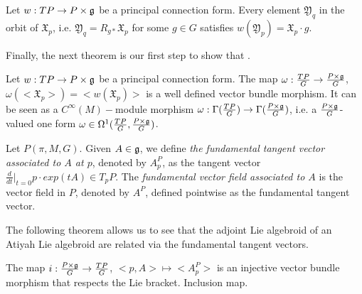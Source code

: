 \begin{proposition}
Let $w:TP \to P \times \mathfrak{g}$ be a principal connection form. Every element $\mathfrak{Y}_q$ in the orbit of $\mathfrak{X}_p$, i.e. $\mathfrak{Y}_q = R_{g*} \mathfrak{X}_p$ for some $g\in G$ satisfies $w(\mathfrak{Y}_p) = \mathfrak{X}_p \cdot g$.
\end{proposition}

Finally, the next theorem is our first step to show that .

\begin{theorem}
Let $w:TP \to P \times \mathfrak{g}$ be a principal connection form. The map $\omega: \frac{TP}{G} \to \frac{P \times \mathfrak{g}}{G}$, $\omega(<\mathfrak{X}_p>) = <w(\mathfrak{X}_p)>$ is a well defined vector bundle morphism. It can be seen as a $C^\infty(M)-$module morphism $\omega: \Gamma(\frac{TP}{G}) \to \Gamma(\frac{P \times \mathfrak{g}}{G})$, i.e. a $\frac{P \times \mathfrak{g}}{G}$-valued one form $\omega \in \Omega^1(\frac{TP}{G}, \frac{P \times \mathfrak{g}}{G})$.
\end{theorem}


\begin{definition}
Let $P(\pi, M, G)$. Given $A \in \mathfrak{g}$, we define \emph{the fundamental tangent vector associated to $A$ at $p$}, denoted by $A_p^P$, as the tangent vector $ \frac{d}{dt}|_{t = 0} p \cdot exp(tA) \in T_pP$. The \emph{fundamental vector field associated to $A$} is the vector field in $P$, denoted by $A^P$, defined pointwise as the fundamental tangent vector.
\end{definition}

The following theorem allows us to see that the adjoint Lie algebroid of an Atiyah Lie algebroid are related via the fundamental tangent vectors.

\begin{lemma}
The map $i:\frac{P \times \mathfrak{g}}{G} \to \frac{TP}{G}$, $<p, A> \mapsto <A_p^P>$ is an injective vector bundle morphism that respects the Lie bracket. Inclusion  map.
\end{lemma}

